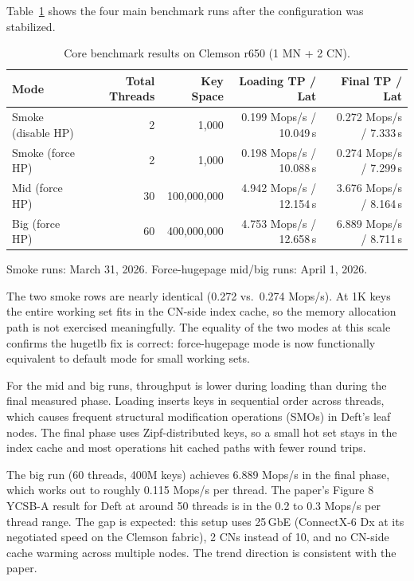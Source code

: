 \documentclass[10pt]{article}
\begin{document}
Table~\ref{tab:core} shows the four main benchmark runs after the configuration
was stabilized.

\begin{table}[h]
\centering
\small
\caption{Core benchmark results on Clemson r650 (1 MN + 2 CN).}
\label{tab:core}
\begin{tabular}{lrrrr}
\toprule
Mode & Total Threads & Key Space & Loading TP / Lat & Final TP / Lat \\
\midrule
Smoke (disable HP) & 2  & 1,000       &
  0.199 Mops/s / 10.049\,\textmu{}s & 0.272 Mops/s / 7.333\,\textmu{}s \\
Smoke (force HP)   & 2  & 1,000       &
  0.198 Mops/s / 10.088\,\textmu{}s & 0.274 Mops/s / 7.299\,\textmu{}s \\
Mid (force HP)     & 30 & 100,000,000 &
  4.942 Mops/s / 12.154\,\textmu{}s & 3.676 Mops/s / 8.164\,\textmu{}s \\
Big (force HP)     & 60 & 400,000,000 &
  4.753 Mops/s / 12.658\,\textmu{}s & 6.889 Mops/s / 8.711\,\textmu{}s \\
\bottomrule
\end{tabular}
\end{table}
\noindent\footnotesize
  Smoke runs: March 31, 2026.
  Force-hugepage mid/big runs: April 1, 2026.
\normalsize
\vspace{4pt}

The two smoke rows are nearly identical (0.272 vs.\ 0.274 Mops/s).
At 1K keys the entire working set fits in the CN-side index cache, so the memory
allocation path is not exercised meaningfully.
The equality of the two modes at this scale confirms the hugetlb fix is correct:
force-hugepage mode is now functionally equivalent to default mode for small working sets.

For the mid and big runs, throughput is lower during loading than during the final
measured phase.
Loading inserts keys in sequential order across threads, which causes frequent
structural modification operations (SMOs) in Deft's leaf nodes.
The final phase uses Zipf-distributed keys, so a small hot set stays in the index
cache and most operations hit cached paths with fewer round trips.

The big run (60 threads, 400M keys) achieves 6.889 Mops/s in the final phase,
which works out to roughly 0.115 Mops/s per thread.
The paper's Figure 8 YCSB-A result for Deft at around 50 threads is in the
0.2 to 0.3 Mops/s per thread range.
The gap is expected: this setup uses 25\,GbE (ConnectX-6 Dx at its negotiated
speed on the Clemson fabric), 2 CNs instead of 10, and no CN-side cache warming
across multiple nodes.
The trend direction is consistent with the paper.
\end{document}
